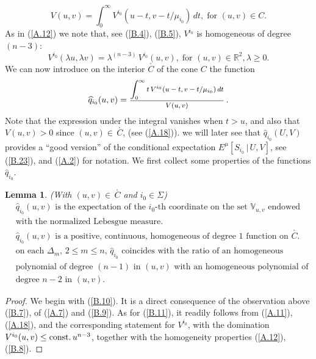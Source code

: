 \documentclass[12pt,leqno]{article}
\def\IR{{\mathbb R}}
\def\IV{{\mathbb V}}
\def\dis{\displaystyle}
\def\f{\footnotesize}
\def\wh{\widehat}
\newtheorem{lemma}[theorem]{Lemma}
\begin{document}
\begin{appendix}
\begin{equation}\label{B.7}
V(u,v) = \dis\int^\infty_0 V^{i_0} (u- t, v - t/\mu_{i_0})\,dt, \; \mbox{for $(u,v) \in C$}.
\end{equation}
As in (\ref{A.12}) we note that, see (\ref{B.4}), (\ref{B.5}), $V^{i_0}$ is homogeneous of degree $(n-3)$:
\begin{equation}\label{B.8}
V^{i_0}(\lambda u, \lambda v) = \lambda^{(n-3)} \,V^{i_0}(u,v), \; \mbox{for $(u,v) \in \IR^2, \lambda \ge 0$}.
\end{equation}
We can now introduce on the interior $\stackrel{_\circ}{C}$ of the cone $C$ the function
\begin{equation}\label{B.9}
\wh{q}_{i_0} (u,v) = \mbox{\f $\dis\frac{\dis\int^\infty_0 t \,V^{i_0} (u - t, v - t/\mu_{i_0}) \, dt}{V(u,v)}$}\, .
\end{equation}
Note that the expression under the integral vanishes when $t > u$, and also that $V(u,v) > 0$ since $(u,v) \in \, \stackrel{_\circ}{C}$, (see (\ref{A.18})). we will later see that $\wh{q}_{i_0}(U,V)$ provides a ``good version'' of the conditional expectation $E^\mu [S_{i_0} \, | \, U,V]$, see (\ref{B.23}), and (\ref{A.2}) for notation. We first collect some properties of the functions $\wh{q}_{i_0}$.

\begin{lemma}\label{lemB.1} (With $(u,v) \in \,\stackrel{_\circ}{C}$ and $i_0 \in \Sigma$)
\begin{align}
&\mbox{$\wh{q}_{i_0} (u,v)$ is the expectation of the $i_0$-th coordinate on the set $\IV_{u,v}$ endowed} \label{B.10}
\\
&\mbox{with the normalized Lebesgue measure.} \nonumber
\\[2ex]
&\mbox{$\wh{q}_{i_0} (u,v)$ is a positive, continuous, homogeneous of degree $1$ function on $\stackrel{_\circ}{C}$}. \label{B.11}
\\[2ex]
& \mbox{on each $\Delta_m$, $2 \le m \le n$, $\wh{q}_{i_0}$ coincides with the ratio of an homogeneous} \label{B.12}
\\
& \mbox{polynomial of degree $(n-1)$ in $(u,v)$ with an homogeneous polynomial of} \nonumber
\\
&\mbox{degree $n-2$ in $(u,v)$}. \nonumber
\end{align}
\end{lemma}

\begin{proof}
We begin with (\ref{B.10}). It is a direct consequence of the observation above (\ref{B.7}), of (\ref{A.7}) and (\ref{B.9}). As for (\ref{B.11}), it readily follows from (\ref{A.11}), (\ref{A.18}), and the corresponding statement for $V^{i_0}$, with the domination $V^{i_0} (u,v) \le {\rm const.} \, u^{n-3}$, together with the homogeneity properties (\ref{A.12}), (\ref{B.8}). 


\end{proof}
\end{appendix}
\end{document}
